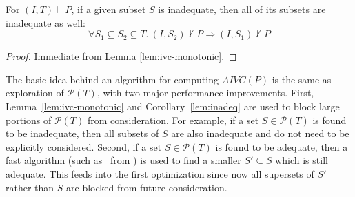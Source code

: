 

\begin{corollary}
\label{lem:inadeq}
For $(I, T) \vdash P$, if a given subset $S$ is inadequate, then all of its subsets are inadequate as well:
\allowbreak $$\forall S_1 \subseteq S_2 \subseteq T.~ (I, S_2) \nvdash P \Rightarrow (I, S_1) \nvdash P$$
\end{corollary}
\begin{proof}
  Immediate from Lemma \ref{lem:ivc-monotonic}.
\end{proof}


The basic idea behind an algorithm for computing $AIVC(P)$ is the same
as exploration of $\mathcal{P}(T)$, with two major performance
improvements. First, Lemma~\ref{lem:ivc-monotonic} and
Corollary~\ref{lem:inadeq} are used to block large portions of
$\mathcal{P}(T)$ from consideration. For example, if a set $S \in
\mathcal{P}(T)$ is found to be inadequate, then all subsets of $S$ are
also inadequate and do not need to be explicitly considered. Second,
if a set $S \in \mathcal{P}(T)$ is found to be adequate, then a fast
algorithm (such as \ucalg\ from \cite{Ghass16}) is used to find a
smaller $S' \subseteq S$ which is still adequate. This feeds into the
first optimization since now all supersets of $S'$ rather than $S$ are
blocked from future consideration.

